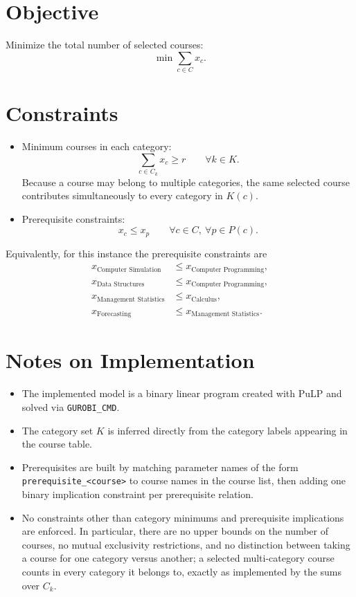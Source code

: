 \section*{Objective}

Minimize the total number of selected courses:
\[
\min \sum_{c \in C} x_c.
\]

\section*{Constraints}

\begin{itemize}
    \item Minimum courses in each category:
    \[
    \sum_{c \in C_k} x_c \ge r
    \qquad \forall k \in K.
    \]
    Because a course may belong to multiple categories, the same selected course contributes simultaneously to every category in $K(c)$.

    \item Prerequisite constraints:
    \[
    x_c \le x_p
    \qquad \forall c \in C,\ \forall p \in P(c).
    \]
\end{itemize}

Equivalently, for this instance the prerequisite constraints are
\[
\begin{aligned}
x_{\text{Computer Simulation}} &\le x_{\text{Computer Programming}},\\
x_{\text{Data Structures}} &\le x_{\text{Computer Programming}},\\
x_{\text{Management Statistics}} &\le x_{\text{Calculus}},\\
x_{\text{Forecasting}} &\le x_{\text{Management Statistics}}.
\end{aligned}
\]

\section*{Notes on Implementation}

\begin{itemize}
    \item The implemented model is a binary linear program created with PuLP and solved via \texttt{GUROBI\_CMD}.
    \item The category set $K$ is inferred directly from the category labels appearing in the course table.
    \item Prerequisites are built by matching parameter names of the form \texttt{prerequisite\_<course>} to course names in the course list, then adding one binary implication constraint per prerequisite relation.
    \item No constraints other than category minimums and prerequisite implications are enforced. In particular, there are no upper bounds on the number of courses, no mutual exclusivity restrictions, and no distinction between taking a course for one category versus another; a selected multi-category course counts in every category it belongs to, exactly as implemented by the sums over $C_k$.
\end{itemize}
